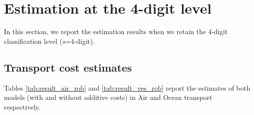 \documentclass[a4paper,11pt]{article}
\begin{document}
\section{Estimation at the 4-digit level \label{app:4digit}}

In this section, we report the estimation results when we retain the 4-digit classification level ($s$=4-digit).

\subsection{Transport cost estimates}


Tables \ref{tab:result_air_rob} and \ref{tab:result_ves_rob} report the estimates of both models (with and without additive costs) in Air and Ocean transport respectively.
\end{document}
